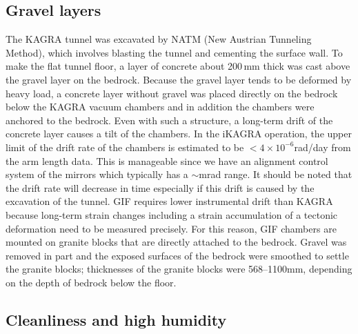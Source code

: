 \documentclass[prd ,twocolumn ,secnumarabic,dvips
,amssymb, amsmath,nobibnotes, aps, prd,superscriptaddress]{revtex4-1}
\begin{document}
{\subsection{Gravel layers}\label{sec:gravel}
%
The KAGRA tunnel was excavated by NATM (New Austrian Tunneling Method), which involves blasting the tunnel and cementing the surface wall. To make the flat tunnel floor, a layer of concrete about 200\,mm thick was cast above the gravel layer on the bedrock. Because the gravel layer tends to be deformed by heavy load, a concrete layer without gravel was placed directly on the bedrock below the KAGRA vacuum chambers and in addition the chambers were anchored to the bedrock. Even with such a structure, a long-term drift of the concrete layer causes a tilt of the chambers. 
In the iKAGRA operation, the upper limit of the drift rate of the chambers is estimated to be $<4\times10^{-6}$rad/day from the arm length data. This is manageable since we have an alignment control system of the mirrors which typically has a $\sim$mrad range. It should be noted that the drift rate will decrease in time especially if this drift is caused by the excavation of the tunnel.
GIF requires lower instrumental drift than KAGRA because long-term strain changes including a strain accumulation of a tectonic deformation need to be measured precisely. For this reason, GIF chambers are mounted on granite blocks that are directly attached to the bedrock.  Gravel was removed in part and the exposed surfaces of the bedrock were smoothed to settle the granite blocks; thicknesses of the granite blocks were 568--1100mm, depending on the depth of bedrock below the floor.

\subsection{Cleanliness and high humidity}
%

}
\end{document}
